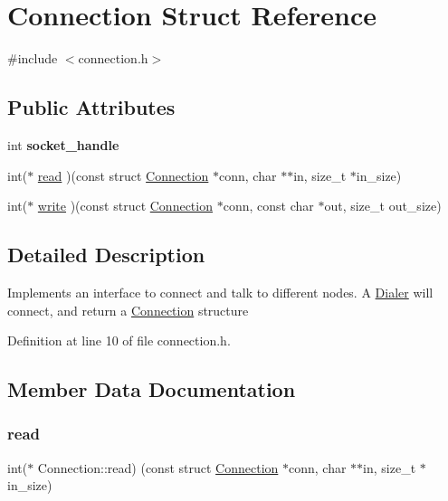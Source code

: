 \hypertarget{struct_connection}{}\section{Connection Struct Reference}
\label{struct_connection}


{\ttfamily \#include $<$connection.\+h$>$}

\subsection*{Public Attributes}
\begin{DoxyCompactItemize}
\item 
\mbox{\label{struct_connection_a67179dde53baeb40e057fff83c580db9}} 
int {\bfseries socket\+\_\+handle}
\item 
int($\ast$ \mbox{\hyperlink{struct_connection_a2a49f61cc45251e0c80af339320eeaf6}{read}} )(const struct \mbox{\hyperlink{struct_connection}{Connection}} $\ast$conn, char $\ast$$\ast$in, size\+\_\+t $\ast$in\+\_\+size)
\item 
int($\ast$ \mbox{\hyperlink{struct_connection_a30845295ec102e6bb5a505490a906689}{write}} )(const struct \mbox{\hyperlink{struct_connection}{Connection}} $\ast$conn, const char $\ast$out, size\+\_\+t out\+\_\+size)
\end{DoxyCompactItemize}


\subsection{Detailed Description}
Implements an interface to connect and talk to different nodes. A \mbox{\hyperlink{struct_dialer}{Dialer}} will connect, and return a \mbox{\hyperlink{struct_connection}{Connection}} structure 

Definition at line 10 of file connection.\+h.



\subsection{Member Data Documentation}
\mbox{\label{struct_connection_a2a49f61cc45251e0c80af339320eeaf6}} 
\subsubsection{\texorpdfstring{read}{read}}
{\footnotesize\ttfamily int($\ast$ Connection\+::read) (const struct \mbox{\hyperlink{struct_connection}{Connection}} $\ast$conn, char $\ast$$\ast$in, size\+\_\+t $\ast$in\+\_\+size)}

